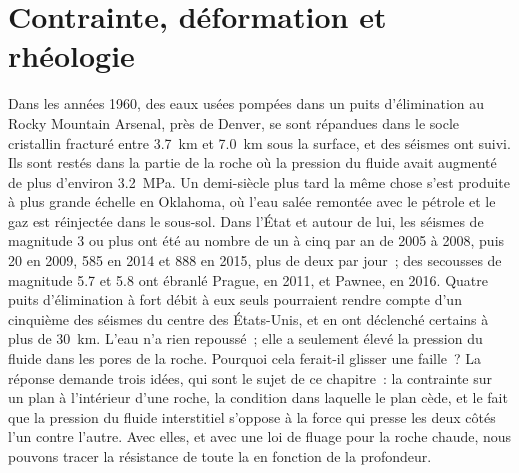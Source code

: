 \chapter{Contrainte, déformation et rhéologie}\label{ch:b1:stress-strain-rheology}

Dans les années 1960, des eaux usées pompées dans un puits d'élimination au Rocky Mountain
Arsenal, près de Denver, se sont répandues dans le socle cristallin fracturé entre
\qty{3.7}{km} et \qty{7.0}{km} sous la surface, et des séismes ont suivi.
Ils sont restés dans la partie de la roche où la pression du fluide avait augmenté de
plus d'environ \qty{3.2}{MPa}.
Un demi-siècle plus tard la même chose s'est produite à plus grande échelle en Oklahoma,
où l'eau salée remontée avec le pétrole et le gaz est réinjectée dans le sous-sol. Dans
l'État et autour de lui, les séismes de magnitude 3 ou plus ont été au nombre de un à
cinq par an de 2005 à 2008, puis \num{20} en 2009, \num{585} en 2014 et
\num{888} en 2015, plus de deux par jour~; des secousses de magnitude 5.7 et 5.8 ont ébranlé
Prague, en 2011, et Pawnee, en 2016. Quatre puits d'élimination à fort débit à eux seuls
pourraient rendre compte d'un cinquième des séismes du centre des États-Unis, et
en ont déclenché certains à plus de \qty{30}{km}.
L'eau n'a rien repoussé~; elle a seulement élevé la pression
du fluide dans les pores de la roche. Pourquoi cela ferait-il glisser une faille~?
La réponse demande trois idées, qui sont le sujet de ce chapitre~: la
contrainte sur un plan à l'intérieur d'une roche, la condition dans laquelle le plan
cède, et le fait que la pression du fluide interstitiel s'oppose à la
force qui presse les deux côtés l'un contre l'autre. Avec elles, et avec une loi de fluage pour
la roche chaude, nous pouvons tracer la résistance de toute la  en fonction de la profondeur.

